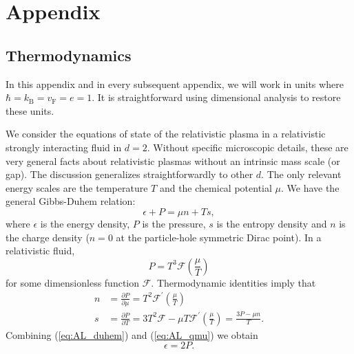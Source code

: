 \chapter{Appendix}
\label{Appendix}
\section{Thermodynamics}\label{appthermo}
In this appendix and in every subsequent appendix, we will work in units where $\hbar=k_{\mathrm{B}}=v_{\mathrm{F}}=e=1$.     It is straightforward using dimensional analysis to restore these units.  

We consider the equations of state of the relativistic plasma in a relativistic strongly interacting fluid in $d=2$.    Without specific microscopic details, these are very general facts about relativistic plasmas without an intrinsic mass scale (or gap).  The discussion generalizes straightforwardly to other $d$.    The only relevant energy scales are the temperature $T$ and the chemical potential $\mu$.     We have the general Gibbs-Duhem relation:\begin{equation} \label{eq:AL_duhem}
\epsilon + P = \mu n + Ts,
\end{equation}where $\epsilon$ is the energy density, $P$ is the pressure, $s$ is the entropy density and $n$ is the charge density ($n=0$ at the particle-hole symmetric Dirac point).   In a relativistic fluid, \begin{equation}
P  = T^3 \mathcal{F}\left(\frac{\mu}{T}\right)
\end{equation}for some dimensionless function $\mathcal{F}$.  Thermodynamic identities imply that \begin{subequations} \label{eq:AL_qmu}\begin{align}
n &= \frac{\partial P}{\partial \mu} = T^2 \mathcal{F}^\prime \left(\frac{\mu}{T}\right) \\
s &= \frac{\partial P}{\partial T} = 3T^2 \mathcal{F} -  \mu T\mathcal{F}^\prime \left(\frac{\mu}{T}\right) = \frac{3P - \mu n }{T}.
\end{align}\end{subequations}Combining (\ref{eq:AL_duhem}) and (\ref{eq:AL_qmu}) we obtain \begin{equation}
\epsilon = 2P.
\end{equation}

